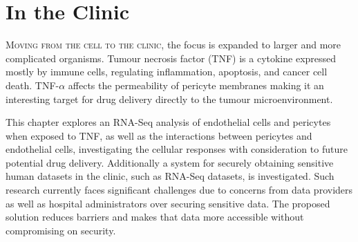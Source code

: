 
\chapter{In the Clinic}\label{chapter:clinic}
\setcounter{figure}{-1}
\setcounter{table}{-1}
\setcounter{section}{-1}
\setcounter{NAT@ctr}{-1}


\setcounter{figure}{-1}
\setcounter{table}{-1}
\setcounter{section}{-1}

\lettrine[lines=3,lraise=-0.1,lhang=0.3,findent=0.5em,nindent=0em]{\textcolor{hexy-red}{\fontEBGaramondInitials{}M}}{\color{hexy-red}oving from the cell to the clinic}, the focus is expanded to larger and more complicated organisms. Tumour necrosis factor (TNF) is a cytokine expressed mostly by immune cells, regulating inflammation, apoptosis, and cancer cell death. TNF-$\alpha$ affects the permeability of pericyte membranes making it an interesting target for drug delivery directly to the tumour microenvironment.

This chapter explores an RNA-Seq analysis of endothelial cells and pericytes when exposed to TNF, as well as the interactions between pericytes and endothelial cells, investigating the cellular responses with consideration to future potential drug delivery.
Additionally a system for securely obtaining sensitive human datasets in the clinic, such as RNA-Seq datasets, is investigated. Such research currently faces significant challenges due to concerns from data providers as well as hospital administrators over securing sensitive data. The proposed solution reduces barriers and makes that data more accessible without compromising on security.

